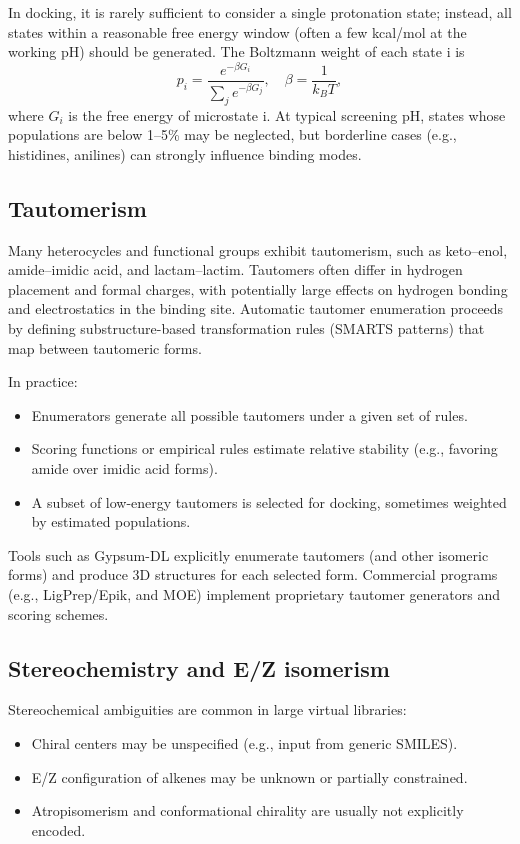\documentclass[12pt, a4paper]{article}
\begin{document}
In docking, it is rarely sufficient to consider a single protonation state; instead, all states within a reasonable free energy window (often a few kcal/mol at the working pH) should be generated. The Boltzmann weight of each state i is
\[
p_i = \frac{e^{-\beta G_i}}{\sum_j e^{-\beta G_j}}, \quad \beta = \frac{1}{k_B T},
\]
where $G_i$ is the free energy of microstate i. At typical screening pH, states whose populations are below 1--5\% may be neglected, but borderline cases (e.g., histidines, anilines) can strongly influence binding modes.

\subsection{Tautomerism}

Many heterocycles and functional groups exhibit tautomerism, such as keto--enol, amide--imidic acid, and lactam--lactim. Tautomers often differ in hydrogen placement and formal charges, with potentially large effects on hydrogen bonding and electrostatics in the binding site. Automatic tautomer enumeration proceeds by defining substructure-based transformation rules (SMARTS patterns) that map between tautomeric forms.

In practice:
\begin{itemize}
  \item Enumerators generate all possible tautomers under a given set of rules.
  \item Scoring functions or empirical rules estimate relative stability (e.g., favoring amide over imidic acid forms).
  \item A subset of low-energy tautomers is selected for docking, sometimes weighted by estimated populations.
\end{itemize}

Tools such as Gypsum-DL explicitly enumerate tautomers (and other isomeric forms) and produce 3D structures for each selected form.\cite{CH6_Ropp2019} Commercial programs (e.g., LigPrep/Epik, and MOE) implement proprietary tautomer generators and scoring schemes.\cite{CH6_Sastry2013}

\subsection{Stereochemistry and E/Z isomerism}

Stereochemical ambiguities are common in large virtual libraries:
\begin{itemize}
  \item Chiral centers may be unspecified (e.g., input from generic SMILES).
  \item E/Z configuration of alkenes may be unknown or partially constrained.
  \item Atropisomerism and conformational chirality are usually not explicitly encoded.
\end{itemize}
\end{document}
